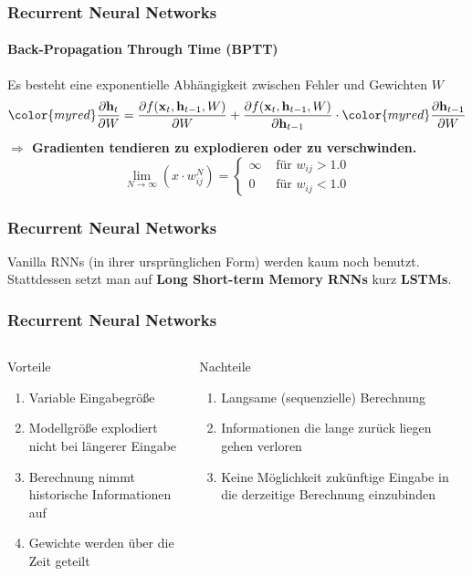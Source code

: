 \documentclass[aspectratio=169]{beamer}
\begin{document}
\begin{frame}
	\frametitle{Recurrent Neural Networks}
	\framesubtitle{Back-Propagation Through Time (BPTT)}
	Es besteht eine exponentielle Abhängigkeit zwischen Fehler und Gewichten $W$
	\begin{equation*}
		{\color{myred}\frac{\partial \mathbf{h}_t}{\partial W}} = \frac{\partial f(\mathbf{x}_t, \mathbf{h}_{t-1}, W)}{\partial W} +  \frac{\partial f(\mathbf{x}_t, \mathbf{h}_{t-1}, W)}{\partial \mathbf{h}_{t-1}} \cdot {\color{myred}\frac{\partial \mathbf{h}_{t-1}}{\partial W}}
	\end{equation*}
	\textbf{$\Rightarrow$ Gradienten tendieren zu explodieren oder zu verschwinden.}
	\begin{equation*}
		\lim\limits_{N \rightarrow \infty}(x \cdot w_{ij}^N) = 
		\begin{cases}
			\infty & \text{ für } w_{ij} > 1.0 \\
			0 & \text{ für } w_{ij} < 1.0
		\end{cases} 
	\end{equation*}
\end{frame}

\begin{frame}
	\frametitle{Recurrent Neural Networks }
	Vanilla RNNs (in ihrer ursprünglichen Form) werden kaum noch benutzt. Stattdessen setzt man auf \textbf{Long Short-term Memory RNNs} kurz \textbf{LSTMs}.
\end{frame}

\begin{frame}
	\frametitle{Recurrent Neural Networks}
	\begin{columns}[t]
		\begin{column}{0.5\textwidth}
			\begin{block}{Vorteile}
			\begin{enumerate}[label={\color{mygreen}\textbf{+}}]
				\item Variable Eingabegröße
				\item Modellgröße explodiert nicht bei längerer Eingabe
				\item Berechnung nimmt historische Informationen auf
				\item Gewichte werden über die Zeit geteilt
			\end{enumerate}
			\end{block}
		\end{column}
		\hfill
		\begin{column}{0.5\textwidth}
			\begin{block}{Nachteile}
			\begin{enumerate}[label={\color{myred}\textbf{-}}]
				\item Langsame (sequenzielle) Berechnung
				\item Informationen die lange zurück liegen gehen verloren
				\item Keine Möglichkeit zukünftige Eingabe in die derzeitige Berechnung einzubinden
			\end{enumerate}
		\end{block}
		\end{column}
	\end{columns}
\end{frame}
\end{document}

